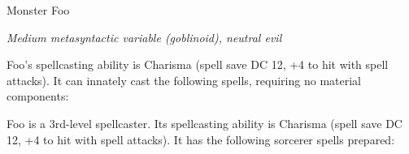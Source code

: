 \documentclass[letterpaper,twocolumn,openany]{dndbook}
\begin{document}
	\begin{monsterbox}{Monster Foo}
		\begin{hangingpar}
			\textit{Medium metasyntactic variable (goblinoid), neutral evil}
		\end{hangingpar}
		
		\dndline%
		
		\basics[%
		armorclass = 9 (12 with \emph{mage armor}),
		hitpoints  = \dice{3d8+3},
		speed      = {30 ft., fly 30 ft.},
		]
		
		\dndline%
		
		\stats[
		STR = \stat{12}, %
		DEX = \stat{8},
		CON = \stat{13},
		INT = \stat{10},
		WIS = \stat{14},
		CHA = \stat{15},
		]
		
		\dndline%
		
		\details[%
		senses = {darkvision 60 ft., passive Perception 10},
		languages = {Common, Goblin},
		challenge = {1},
		]
		
		\dndline%
		
		
		\begin{monsteraction}
			Foo's spellcasting ability is Charisma (spell save DC 12, +4 to hit with spell attacks). It can innately cast the following spells, requiring no material components:
			\medskip
		\end{monsteraction}
		
		\begin{monsteraction}[Spellcasting]
			Foo is a 3rd-level spellcaster. Its spellcasting ability is Charisma (spell save DC 12, +4 to hit with spell attacks). It has the following sorcerer spells prepared:
			\medskip
		\end{monsteraction}
		

\end{monsterbox}
\end{document}
